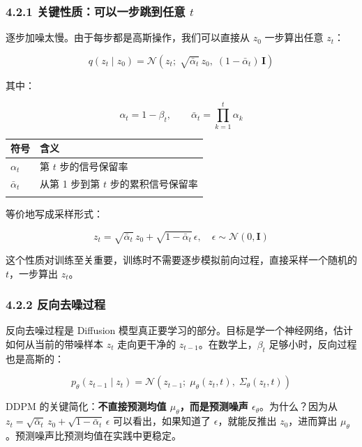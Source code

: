 \documentclass[
  chinese,
]{ctexart}
\begin{document}
\subsubsection{\texorpdfstring{4.2.1 关键性质：可以一步跳到任意
\(t\)}{4.2.1 关键性质：可以一步跳到任意 t}}\label{ux5173ux952eux6027ux8d28ux53efux4ee5ux4e00ux6b65ux8df3ux5230ux4efbux610f-t}

逐步加噪太慢。由于每步都是高斯操作，我们可以直接从 \(z_0\) 一步算出任意
\(z_t\)：

\[
q(z_t \mid z_0) = \mathcal{N}\!\left(z_t;\; \sqrt{\bar{\alpha}_t}\, z_0,\; (1 - \bar{\alpha}_t)\, \mathbf{I}\right)
\]

其中：

\[
\alpha_t = 1 - \beta_t, \qquad \bar{\alpha}_t = \prod_{k=1}^{t} \alpha_k
\]

\begin{center}
\begin{tabular}{@{}>{\raggedright\arraybackslash}p{} >{\raggedright\arraybackslash}p{}@{}}
\toprule\noalign{}
符号 & 含义 \\
\midrule\noalign{}
\(\alpha_t\) & 第 \(t\) 步的信号保留率 \\
\(\bar{\alpha}_t\) & 从第 1 步到第 \(t\) 步的累积信号保留率 \\
\bottomrule\noalign{}
\end{tabular}
\end{center}

等价地写成采样形式：

\[
z_t = \sqrt{\bar{\alpha}_t}\, z_0 + \sqrt{1 - \bar{\alpha}_t}\, \epsilon, \quad \epsilon \sim \mathcal{N}(0, \mathbf{I})
\]

这个性质对训练至关重要，训练时不需要逐步模拟前向过程，直接采样一个随机的
\(t\)，一步算出 \(z_t\)。

\subsubsection{4.2.2
反向去噪过程}\label{ux53cdux5411ux53bbux566aux8fc7ux7a0b}

反向去噪过程是 Diffusion
模型真正要学习的部分。目标是学一个神经网络，估计如何从当前的带噪样本
\(z_t\) 走向更干净的 \(z_{t-1}\)。在数学上，\(\beta_t\)
足够小时，反向过程也是高斯的：

\[
p_\theta(z_{t-1} \mid z_t) = \mathcal{N}\!\left(z_{t-1};\; \mu_\theta(z_t, t),\; \Sigma_\theta(z_t, t)\right)
\]

DDPM 的关键简化：\textbf{不直接预测均值 \(\mu_\theta\)，而是预测噪声
\(\epsilon_\theta\)}。为什么？因为从
\(z_t = \sqrt{\bar{\alpha}_t}\, z_0 + \sqrt{1 - \bar{\alpha}_t}\, \epsilon\)
可以看出，如果知道了 \(\epsilon\)，就能反推出 \(z_0\)，进而算出
\(\mu_\theta\)。预测噪声比预测均值在实践中更稳定。
\end{document}
